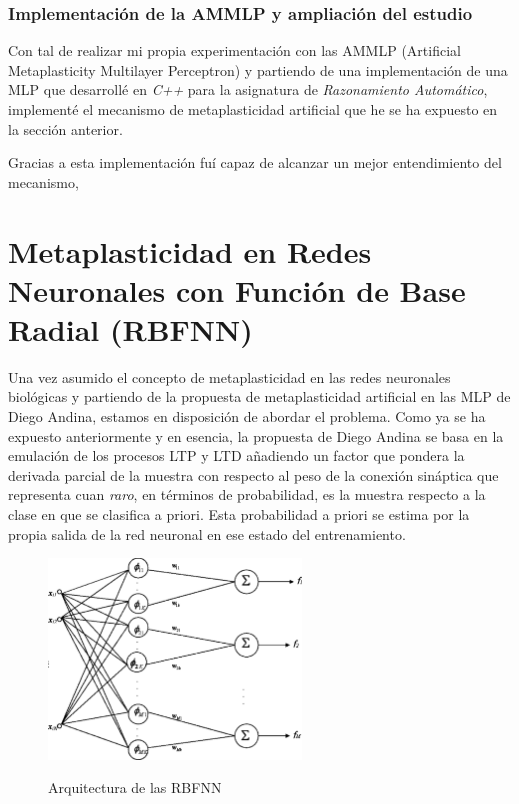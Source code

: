 \documentclass[10pt,a4paper, twocolumn]{report}
\begin{document}
\subsection{Implementación de la AMMLP y ampliación del estudio}
Con tal de realizar mi propia experimentación con las AMMLP (Artificial Metaplasticity Multilayer Perceptron) y partiendo de una implementación de una MLP que desarrollé en \textit{C++} para la asignatura de \textit{Razonamiento Automático}, implementé el mecanismo de metaplasticidad artificial que he se ha expuesto en la sección anterior.

Gracias a esta implementación fuí capaz de alcanzar un mejor entendimiento del mecanismo, 

\chapter{Metaplasticidad en Redes Neuronales con Función de Base Radial (RBFNN)}
Una vez asumido el concepto de metaplasticidad en las redes neuronales biológicas y partiendo de la propuesta de metaplasticidad artificial en las MLP de Diego Andina, estamos en disposición de abordar el problema. 
Como ya se ha expuesto anteriormente y en esencia, la propuesta de Diego Andina se basa en la emulación de los procesos LTP y LTD añadiendo un factor que pondera la derivada parcial de la muestra con respecto al peso de la conexión sináptica que representa cuan \textit{raro}, en términos de probabilidad, es la muestra respecto a la clase en que se clasifica a priori. Esta probabilidad a priori se estima por la propia salida de la red neuronal en ese estado del entrenamiento. 

\begin{figure}[h!]{}
    \centering
    \includegraphics[width=0.6\textwidth]{img/RBFN1.png}
    \label{fig:RBFNN1}
    \caption{Arquitectura de las RBFNN}
\end{figure}
\end{document}
